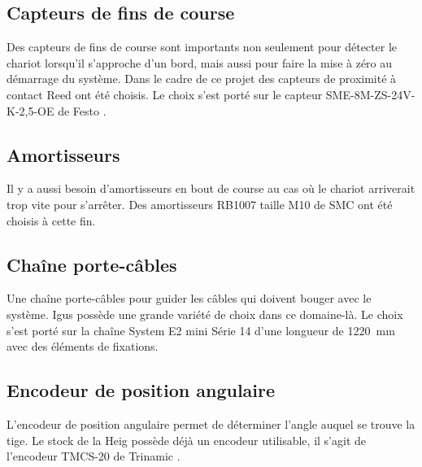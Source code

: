 \subsection{Capteurs de fins de course}
Des capteurs de fins de course sont importants non seulement pour détecter le chariot lorsqu'il s'approche d'un bord, mais aussi
pour faire la mise à zéro au démarrage du système. Dans le cadre de ce projet des capteurs de proximité à contact Reed ont été choisis.
Le choix s'est porté sur le capteur SME-8M-ZS-24V-K-2,5-OE de Festo \cite{Festo}.

\subsection{Amortisseurs}
Il y a aussi besoin d'amortisseurs en bout de course au cas où le chariot arriverait trop vite pour s'arrêter. Des amortisseurs RB1007 taille M10
de SMC \cite{SMC} ont été choisis à cette fin.

\subsection{Chaîne porte-câbles}
Une chaîne porte-câbles pour guider les câbles qui doivent bouger avec le système. Igus \cite{Igus} possède une grande variété de choix dans
ce domaine-là. Le choix s'est porté sur la chaîne System E2 mini Série 14 d'une longueur de 1220~mm avec des éléments de fixations.

\subsection{Encodeur de position angulaire}
L'encodeur de position angulaire permet de déterminer l'angle auquel se trouve la tige. Le stock de la \acrshort{Heig} possède déjà un encodeur
utilisable, il s'agit de l'encodeur TMCS-20 de Trinamic \cite{Trinamic}.